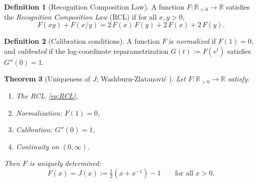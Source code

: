 \documentclass[12pt]{article}
\newtheorem{theorem}{Theorem}[section]
\theoremstyle{definition}
\newtheorem{definition}[theorem]{Definition}
\theoremstyle{remark}
\begin{document}
\begin{definition}[Recognition Composition Law]
\label{def:RCL}
A function $F : \mathbb{R}_{>0} \to \mathbb{R}$ satisfies the
\emph{Recognition Composition Law} (RCL) if for all $x, y > 0$,
\begin{equation}
  F(xy) + F(x/y) = 2\,F(x)\,F(y) + 2\,F(x) + 2\,F(y).
  \label{eq:RCL}
\end{equation}
\end{definition}

\begin{definition}[Calibration conditions]
A function $F$ is \emph{normalized} if $F(1) = 0$, and \emph{calibrated}
if the log-coordinate reparametrization $G(t) := F(e^t)$ satisfies
$G''(0) = 1$.
\end{definition}

\begin{theorem}[Uniqueness of $J$; Washburn-Zlatanovi\'c
{\cite{WashburnZlatanovic2026Math935}}]
\label{thm:J-unique}
Let $F : \mathbb{R}_{>0} \to \mathbb{R}$ satisfy:
\begin{enumerate}[label=\normalfont(\roman*)]
  \item The RCL~\eqref{eq:RCL},
  \item Normalization: $F(1) = 0$,
  \item Calibration: $G''(0) = 1$,
  \item Continuity on $(0,\infty)$.
\end{enumerate}
Then $F$ is uniquely determined:
\begin{equation}
  F(x) = J(x) := \tfrac{1}{2}(x + x^{-1}) - 1
  \qquad\text{for all } x > 0.
  \label{eq:J-cost}
\end{equation}
\end{theorem}
\end{document}
